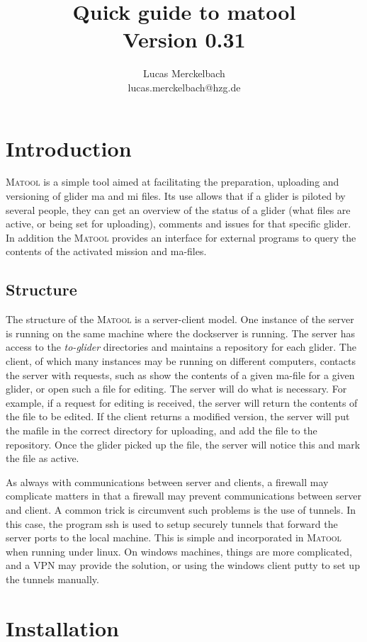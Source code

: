 \documentclass{article}
\author{Lucas Merckelbach\\lucas.merckelbach@hzg.de}
\title{Quick guide to matool\\{\small Version 0.31}}
\newcommand{\mt}{\textsc{Matool}}
\begin{document}
\maketitle
\tableofcontents
\section{Introduction}
\mt{} is a simple tool aimed at facilitating the preparation,
uploading and versioning of glider ma and mi files. Its use allows
that if a glider is piloted by several people, they can get an
overview of the status of a glider (what files are active, or being
set for uploading), comments and issues for that specific glider. In
addition the \mt{} provides an interface for external programs to
query the contents of the activated mission and ma-files.

\subsection{Structure}
The structure of the \mt{} is a server-client model. One instance of
the server is running on the same machine where the dockserver is
running. The server has access to the \emph{to-glider} directories and
maintains a repository for each glider. The client, of which many
instances may be running on different computers, contacts the server
with requests, such as show the contents of a given ma-file for a
given glider, or open such a file for editing. The server will do what
is necessary. For example, if a request for editing is received, the
server will return the contents of the file to be edited. If the
client returns a modified version, the server will put the mafile in
the correct directory for uploading, and add the file to the
repository. Once the glider picked up the file, the server will notice
this and mark the file as active.

As always with communications between server and clients, a firewall
may complicate matters in that a firewall may prevent communications
between server and client. A common trick is circumvent such problems
is the use of tunnels. In this case, the program ssh is used to setup
securely tunnels that forward the server ports to the local
machine. This is simple and incorporated in \mt{} when running under
linux. On windows machines, things are more complicated, and a VPN may
provide the solution, or using the windows client putty to set up the
tunnels manually.

\section{Installation}
\end{document}

